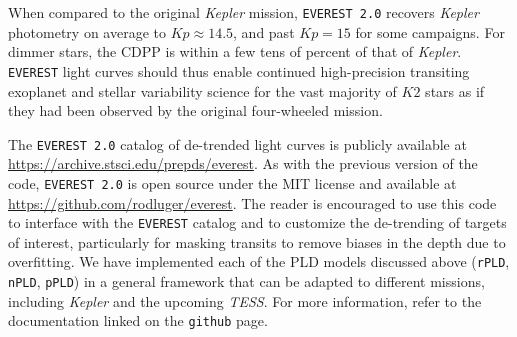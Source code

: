\documentclass[]{emulateapj}
\newcommand{\Kp}{\ensuremath{Kp}}
\begin{document}
When compared to the original \emph{Kepler} mission, \texttt{EVEREST 2.0}
recovers \emph{Kepler} photometry on average to $\Kp \approx 14.5$, and past
$\Kp = 15$ for some campaigns. For dimmer stars, the CDPP is within a few tens
of percent of that of \emph{Kepler}. \texttt{EVEREST} light curves should thus enable 
continued high-precision transiting exoplanet and stellar variability science 
for the vast majority of $K2$ stars as if they had been observed by the original
four-wheeled mission.

The \texttt{EVEREST 2.0} catalog of de-trended light curves is publicly available
at \url{https://archive.stsci.edu/prepds/everest}.
As with the previous version of the code, \texttt{EVEREST 2.0} is open source under
the MIT license and available at \url{https://github.com/rodluger/everest}.
%
%
%
%
The reader is encouraged to use this code
to interface with the \texttt{EVEREST} catalog and to customize the de-trending
of targets of interest, particularly for masking transits to remove biases in
the depth due to overfitting. We have implemented each of the PLD models discussed
above (\texttt{rPLD}, \texttt{nPLD}, \texttt{pPLD}) in a general framework that
can be adapted to different missions, including \emph{Kepler} and the upcoming
\emph{TESS}. For more information, refer to the documentation linked 
on the \texttt{github} page.




\end{document}
